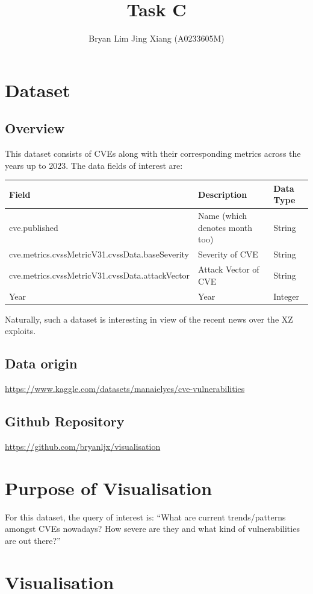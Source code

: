 \documentclass[a4paper, 11pt]{article}
\author{Bryan Lim Jing Xiang (A0233605M)}
\date{}
\title{Task C}
\begin{document}
\maketitle
\section{Dataset}
\label{sec:org970d49b}
\subsection{Overview}
\label{sec:org773d49e}
This dataset consists of CVEs along with their corresponding metrics across the years up to 2023. The data fields of interest are:

\begin{center}
\begin{tabular}{lll}
Field & Description & Data Type\\[0pt]
\hline
cve.published & Name (which denotes month too) & String\\[0pt]
cve.metrics.cvssMetricV31.cvssData.baseSeverity & Severity of CVE & String\\[0pt]
cve.metrics.cvssMetricV31.cvssData.attackVector & Attack Vector of CVE & String\\[0pt]
Year & Year & Integer\\[0pt]
\end{tabular}
\end{center}

Naturally, such a dataset is interesting in view of the recent news over the XZ exploits.
\subsection{Data origin}
\label{sec:orgc84cd51}
\url{https://www.kaggle.com/datasets/manaielyes/cve-vulnerabilities}
\subsection{Github Repository}
\label{sec:org662427b}
\url{https://github.com/bryanljx/visualisation}
\section{Purpose of Visualisation}
\label{sec:orgd32f8f1}
For this dataset, the query of interest is: ``What are current trends/patterns amongst CVEs nowadays? How severe are they and what kind of vulnerabilities are out there?''
\section{Visualisation}
\label{sec:org827b7dc}
\end{document}

